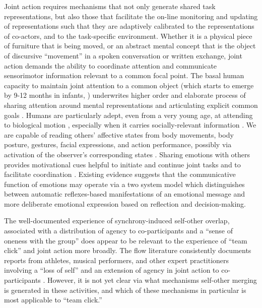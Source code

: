 Joint action requires mechanisms that not only generate shared task representations, but also those that facilitate the on-line monitoring and updating of representations such that they are adaptively calibrated to the representations of co-actors, and to the task-specific environment.  Whether it is a physical piece of furniture that is being moved, or an abstract mental concept that is the object of discursive ``movement'' in a spoken conversation or written exchange, joint action demands the ability to coordinate attention and communicate sensorimotor information relevant to a common focal point.  The basal human capacity to maintain joint attention to a common object (which starts to emerge by 9-12 months in infants, \cite[see]{Carpenter2013}) underwrites higher order and elaborate process of sharing attention around mental representations and articulating explicit common goals \citep{Tomasello2014}.
Humans are particularly adept, even from a very young age, at attending to biological motion \citep{Scholl2000}, especially when it carries socially-relevant information \citep{Kozlowski1977,Cutting1977,Dittrich1996}.  We are capable of reading others' affective states from body movements, body posture, gestures, facial expressions, and action performance, possibly via activation of the observer's corresponding states \citep{Bastiaansen2009,Borgomaneri2012}. Sharing emotions with others provides motivational cues helpful to initiate and continue joint tasks and to facilitate coordination \citep{Michael2016}. Existing evidence suggests that the communicative function of emotions may operate via a two system model which distinguishes between automatic reflexes-based manifestations of an emotional message and more deliberate emotional expression based on reflection and decision-making\citep{DeGelder2006}.

The well-documented experience of synchrony-induced self-other overlap, associated with a distribution of agency to co-participants and a ``sense of oneness with the group'' \citep{Swann2012} does appear to be relevant to the experience of ``team click'' and joint action more broadly. The flow literature consistently documents reports from athletes, musical performers, and other expert practitioners involving a ``loss of self'' and an extension of agency in joint action to co-participants \citep{Jackson1995,Jackson1999}.  However, it is not yet clear via what mechanisms self-other merging is generated in these activities, and which of these mechanisms in particular is most applicable to ``team click.''


